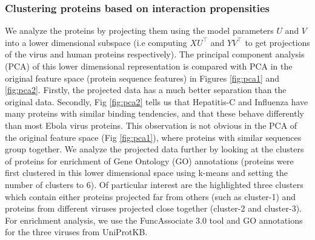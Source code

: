 \documentclass{bioinfo}
\begin{document}
\subsubsection{Clustering proteins based on interaction propensities}
We analyze the proteins by projecting them using the model parameters $U$ and $V$ into a lower dimensional subspace 
(i.e computing $X U^\intercal$ and $Y V^\intercal$ to get projections of the virus and human proteins respectively).  
The principal component analysis (PCA) of this lower dimensional representation is compared with PCA in the original feature space (protein sequence features) in Figures \ref{fig:pca1} and \ref{fig:pca2}. 
Firstly, the projected data has a much better separation than the original data.
Secondly, Fig \ref{fig:pca2} tells us that Hepatitis-C and Influenza have many proteins with similar binding tendencies, and that these behave differently than most Ebola virus proteins. This observation is not obvious in the PCA of the original feature space (Fig \ref{fig:pca1}), where proteins with similar sequences group together.
We analyze the projected data further by looking at the clusters of proteins for enrichment of Gene Ontology (GO) annotations (proteins were first clustered in this lower dimensional space using k-means and setting the number of clusters to 6). Of particular interest are the highlighted three clusters which contain either proteins projected far from others (such as cluster-1) and proteins from different viruses projected close together (cluster-2 and cluster-3).
For enrichment analysis, we use the FuncAssociate 3.0 \citep{funcAsso} tool and GO annotations for the three viruses from UniProtKB.
\end{document}
